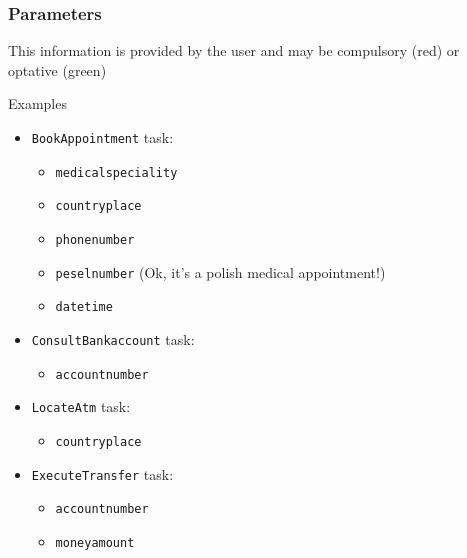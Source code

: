 \documentclass[11pt]{beamer}
\begin{document}
\begin{frame}[fragile]
\frametitle{Parameters}
This information is provided by the user and may be compulsory ({\color{red}red}) or optative ({\color{teal}green})
	\scriptsize
	\begin{block}{Examples}
		\begin{itemize}
			\item \texttt{BookAppointment} task:
			\begin{itemize}
				\item \scriptsize{\color{red} \texttt{medicalspeciality}}
				\item \scriptsize{\color{red} \texttt{countryplace}}
				\item \scriptsize{\color{red} \texttt{phonenumber}}
				\item \scriptsize{\color{red} \texttt{peselnumber}} (Ok, it's a polish medical appointment!)
				\item \scriptsize{\color{teal} \texttt{datetime}}
			\end{itemize}
			\item \texttt{ConsultBankaccount} task: 
			\begin{itemize}
				\item \scriptsize{\color{red} \texttt{accountnumber}}
			\end{itemize}
			\item \texttt{LocateAtm} task: 
			\begin{itemize}
				\item \scriptsize{\color{red} \texttt{countryplace}}
			\end{itemize}
			\item \texttt{ExecuteTransfer} task: 
			\begin{itemize}
				\item \scriptsize{\color{red} \texttt{accountnumber}}
				\item \scriptsize{\color{red} \texttt{moneyamount}}
			\end{itemize}
		\end{itemize}
	\end{block}
\end{frame}
\end{document}
